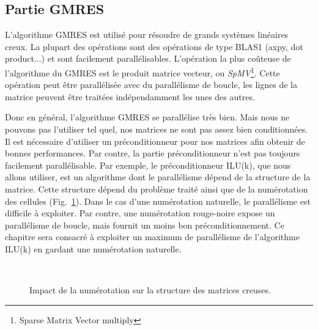 \subsection{Partie GMRES}
L'algorithme GMRES est utilisé pour résoudre de grands systèmes linéaires creux.
%
La plupart des opérations sont des opérations de type BLAS1 (axpy, dot product...) et sont facilement parallélisables.
%
L'opération la plus coûteuse de l'algorithme du GMRES est le produit matrice vecteur, ou {\em SpMV}\footnote{Sparse Matrix Vector multiply}.
%
Cette opération peut être parallélisée avec du parallélisme de boucle, les lignes de la matrice peuvent être traitées indépendamment les unes des autres.


Donc en général, l'algorithme GMRES se parallélise très bien.
%
Mais nous ne pouvons pas l'utiliser tel quel, nos matrices ne sont pas assez bien conditionnées.
%
Il est nécessaire d'utiliser un préconditionneur pour nos matrices afin obtenir de bonnes performances.
%
Par contre, la partie préconditionneur n'est pas toujours facilement parallélisable.
%
Par exemple, le préconditionneur ILU(k), que nous allons utiliser, est un algorithme dont le parallélisme dépend de la structure de la matrice.
%
Cette structure dépend du problème traité ainsi que de la numérotation des cellules (Fig.~\ref{fig:matrix_ordering}).
%
Dans le cas d'une numérotation naturelle, le parallélisme est difficile à exploiter.
%
Par contre, une numérotation rouge-noire expose un parallélisme de boucle, mais fournit un moins bon préconditionnement\cite{red_black_ilu2}.
%
Ce chapitre sera consacré à exploiter un maximum de parallélisme de l'algorithme ILU(k) en gardant une numérotation naturelle.

\begin{figure}[!ht]
     \begin{center}
        \\%
    \end{center}
    \caption{Impact de la numérotation sur la structure des matrices creuses.}
    \label{fig:matrix_ordering}
\end{figure}



